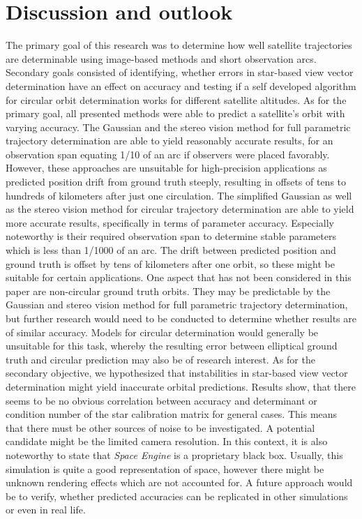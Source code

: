 \documentclass[10pt,a4paper]{article}
\begin{document}
	\section{Discussion and outlook}\label{sec:conclusion}
	The primary goal of this research was to determine how well satellite trajectories are determinable using image-based methods and short observation arcs. Secondary goals consisted of identifying, whether errors in star-based view vector determination have an effect on accuracy and testing if a self developed algorithm for circular orbit determination works for different satellite altitudes.\newline
	As for the primary goal, all presented methods were able to predict a satellite's orbit with varying accuracy. The Gaussian and the stereo vision method for full parametric trajectory determination are able to yield reasonably accurate results, for an observation span equating 1/10 of an arc if observers were placed favorably. However, these approaches are unsuitable for high-precision applications as predicted position drift from ground truth steeply, resulting in offsets of tens to hundreds of kilometers after just one circulation.\newline
	The simplified Gaussian as well as the stereo vision method for circular trajectory determination are able to yield more accurate results, specifically in terms of parameter accuracy. Especially noteworthy is their required observation span to determine stable parameters which is less than 1/1000 of an arc. The drift between predicted position and ground truth is offset by tens of kilometers after one orbit, so these might be suitable for certain applications.\newline
	One aspect that has not been considered in this paper are non-circular ground truth orbits. They may be predictable by the Gaussian and stereo vision method for full parametric trajectory determination, but further research would need to be conducted to determine whether results are of similar accuracy. Models for circular determination would generally be unsuitable for this task, whereby the resulting error between elliptical ground truth and circular prediction may also be of research interest.\newline
	As for the secondary objective, we hypothesized that instabilities in star-based view vector determination might yield inaccurate orbital predictions. Results show, that there seems to be no obvious correlation between accuracy and determinant or condition number of the star calibration matrix for general cases. This means that there must be other sources of noise to be investigated. A potential candidate might be the limited camera resolution. In this context, it is also noteworthy to state that \emph{Space Engine} is a proprietary black box. Usually, this simulation is quite a good representation of space, however there might be unknown rendering effects which are not accounted for. A future approach would be to verify, whether predicted accuracies can be replicated in other simulations or even in real life.
	
\end{document}
